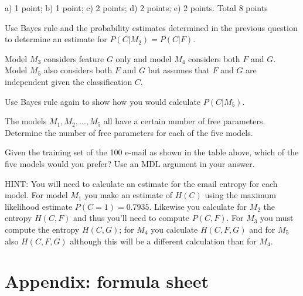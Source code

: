 \documentclass[a4paper]{article}
\begin{document}
\begin{exam}
\begin{vraag}{a) 1 point; b) 1 point; c) 2 points; d) 2 points; e) 2 points. Total 8 points}
\begin{deelvraag}
  Use Bayes rule and the probability estimates determined in the previous question
  to determine an estimate for $P(C|M_2)=P(C|F)$.
\end{deelvraag}
Model $M_3$ considers feature $G$ only and model $M_4$ considers both $F$ and $G$. Model $M_5$ also considers both $F$ and $G$ but assumes that $F$ and $G$ are independent given the classification $C$.
\begin{deelvraag}
  Use Bayes rule again to show how you would calculate $P(C|M_5)$.
\end{deelvraag}
\begin{deelvraag}
  The models $M_1, M_2,\ldots,M_5$ all have a certain number of free parameters.
  Determine the number of free parameters for each of the five models.
\end{deelvraag}
\begin{deelvraag}
  Given the training set of the 100 e-mail as shown in the table above,
  which of the five models would you prefer? Use an MDL argument in your answer.

  HINT: You will need to calculate an estimate for the email entropy for each model.
  For model $M_1$ you make an estimate of $H(C)$ using the maximum likelihood estimate $P(C=1)=0.7935$.
  Likewise you calculate for $M_2$ the entropy $H(C,F)$ and thus you'll need to compute $P(C,F)$.
  For $M_3$ you must compute the entropy $H(C,G)$; for $M_4$
  you calculate $H(C,F,G)$ and for $M_5$ also $H(C,F,G)$ although this will be a different calculation
  than for $M_4$.
\end{deelvraag}
\end{vraag}

\newpage
\section*{Appendix: formula sheet}


\end{exam}
\end{document}
